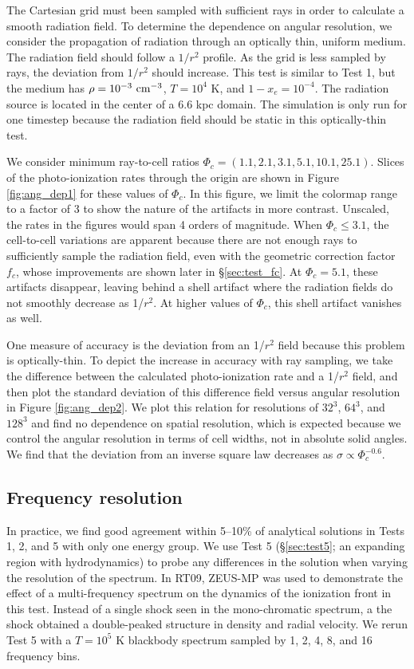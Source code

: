 \documentclass[12pt,preprint]{aastex}
\begin{document}
The Cartesian grid must been sampled with sufficient rays in order to
calculate a smooth radiation field.  To determine the dependence on
angular resolution, we consider the propagation of radiation through
an optically thin, uniform medium.  The radiation field should follow
a $1/r^2$ profile.  As the grid is less sampled by rays, the deviation
from $1/r^2$ should increase.  This test is similar to Test 1, but the
medium has $\rho = 10^{-3}~\cubecm$, $T = 10^4$ K, and $1 - x_e =
10^{-4}$.  The radiation source is located in the center of a 6.6 kpc
domain.  The simulation is only run for one timestep because the
radiation field should be static in this optically-thin test.  

We consider minimum ray-to-cell ratios $\Phi_c = (1.1, 2.1, 3.1, 5.1,
10.1, 25.1)$.  Slices of the photo-ionization rates through the origin
are shown in Figure \ref{fig:ang_dep1} for these values of $\Phi_c$.
In this figure, we limit the colormap range to a factor of 3 to show
the nature of the artifacts in more contrast.  Unscaled, the rates in
the figures would span 4 orders of magnitude.  When $\Phi_c \le 3.1$,
the cell-to-cell variations are apparent because there are not enough
rays to sufficiently sample the radiation field, even with the
geometric correction factor $f_c$, whose improvements are shown later
in \S\ref{sec:test_fc}.  At $\Phi_c = 5.1$, these artifacts disappear,
leaving behind a shell artifact where the radiation fields do not
smoothly decrease as 1/$r^2$.  At higher values of $\Phi_c$, this
shell artifact vanishes as well.  

One measure of accuracy is the deviation from an 1/$r^2$ field because
this problem is optically-thin.  To depict the increase in accuracy
with ray sampling, we take the difference between the calculated
photo-ionization rate and a 1/$r^2$ field, and then plot the standard
deviation of this difference field versus angular resolution in Figure
\ref{fig:ang_dep2}.  We plot this relation for resolutions of $32^3$,
$64^3$, and $128^3$ and find no dependence on spatial resolution,
which is expected because we control the angular resolution in terms
of cell widths, not in absolute solid angles.  We find that the
deviation from an inverse square law decreases as $\sigma \propto
\Phi_c^{-0.6}$.

\subsection{Frequency resolution}

In practice, we find good agreement within 5--10\% of analytical
solutions in Tests 1, 2, and 5 with only one energy group.  We use
Test 5 (\S\ref{sec:test5}; an expanding  region with
hydrodynamics) to probe any differences in the solution when varying
the resolution of the spectrum.  In RT09, ZEUS-MP was used to
demonstrate the effect of a multi-frequency spectrum on the dynamics
of the ionization front in this test.  Instead of a single shock seen
in the mono-chromatic spectrum, a the shock obtained a double-peaked
structure in density and radial velocity.  We rerun Test 5 with a
$T=10^5$ K blackbody spectrum sampled by 1, 2, 4, 8, and 16 frequency
bins.
\end{document}
